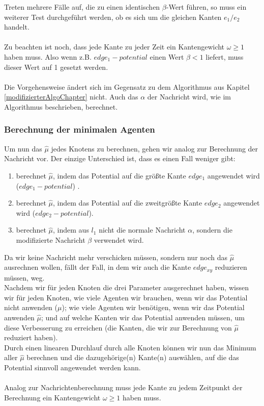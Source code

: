 	Treten mehrere Fälle auf, die zu einen identischen $\beta$-Wert führen, so muss ein weiterer Test durchgeführt werden, ob es sich um die gleichen Kanten $e_{1} / e_{2}$ handelt. 
	\\
	\\
	Zu beachten ist noch, dass jede Kante zu jeder Zeit ein Kantengewicht $\omega \geq 1$ haben muss. Also wenn z.B. $edge_{1} - potential$ einen Wert $\beta < 1$ liefert, muss dieser Wert auf 1 gesetzt werden.
	\\
	\\
	Die Vorgehensweise ändert sich im Gegensatz zu dem Algorithmus aus Kapitel \ref{modifizierterAlgoChapter} nicht. Auch das $\alpha$ der Nachricht wird, wie im Algorithmus beschrieben, berechnet.
	
	
	\subsubsection{Berechnung der minimalen Agenten}
	
	Um nun das $\hat{\mu}$ jedes Knotens zu berechnen, gehen wir analog zur Berechnung der Nachricht vor. Der einzige Unterschied ist, dass es einen Fall weniger gibt: 
	\begin{enumerate}
		\item berechnet $\hat{\mu}$, indem das Potential auf die größte Kante $edge_{1}$ angewendet wird ($edge_{1} - potential$) .
		\item berechnet $\hat{\mu}$, indem das Potential auf die zweitgrößte Kante $edge_{2}$ angewendet wird ($edge_{2} - potential$).
		\item berechnet $\hat{\mu}$, indem aus $l_{1}$ nicht die normale Nachricht $\alpha$, sondern die modifizierte Nachricht $\beta$ verwendet wird.
	\end{enumerate}
	Da wir keine Nachricht mehr verschicken müssen, sondern nur noch das $\hat{\mu}$ ausrechnen wollen, fällt der Fall, in dem wir auch die Kante $edge_{xy}$ reduzieren müssen, weg.\\
	Nachdem wir für jeden Knoten die drei Parameter ausgerechnet haben, wissen wir für jeden Knoten, wie viele Agenten wir brauchen, wenn wir das Potential nicht anwenden ($\mu$); wie viele Agenten wir benötigen, wenn wir das Potential anwenden $\hat{\mu}$; und auf welche Kanten wir das Potential anwenden müssen, um diese Verbesserung zu erreichen (die Kanten, die wir zur Berechnung von $\hat{\mu}$ reduziert haben).\\
	Durch einen linearen Durchlauf durch alle Knoten können wir nun das Minimum aller $\hat{\mu}$ berechnen und die dazugehörige(n) Kante(n) auswählen, auf die das Potential sinnvoll angewendet werden kann.
	\\
	\\
	Analog zur Nachrichtenberechnung muss jede Kante zu jedem Zeitpunkt der Berechnung ein Kantengewicht $\omega \geq 1$ haben muss. 
	
